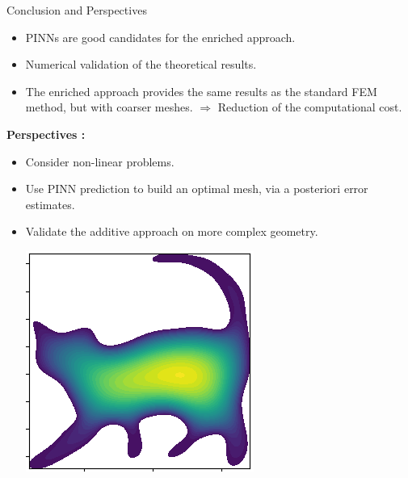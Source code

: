 \begin{frame}[label={lastslide}]{Conclusion and Perspectives}
	\begin{itemize}
		\item PINNs are good candidates for the enriched approach. 
		\item Numerical validation of the theoretical results.
		\item The enriched approach provides the same results as the standard FEM method, but with coarser meshes.
		$\Rightarrow$ Reduction of the computational cost.
	\end{itemize}

	\textbf{Perspectives :}

	\begin{itemize}
		\item Consider non-linear problems. %
		\item Use PINN prediction to build an optimal mesh, via a posteriori error estimates.
		\item Validate the additive approach on more complex geometry.
		
		\centering
		\vspace{7pt}
		\includegraphics[width=0.3\linewidth]{images/conclu_cat.png}
	\end{itemize}
\end{frame}

